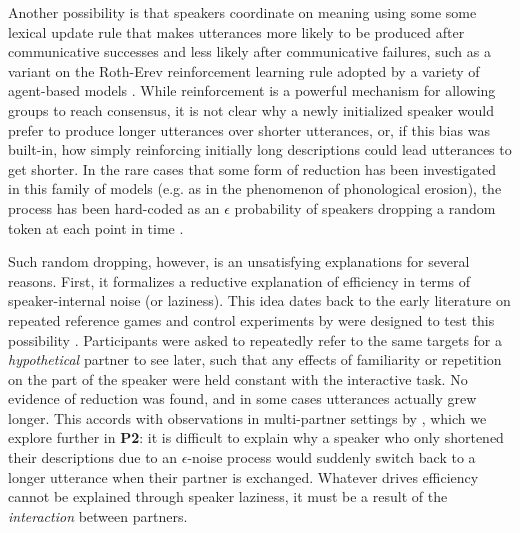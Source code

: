 Another possibility is that speakers coordinate on meaning using some some lexical update rule that makes utterances more likely to be produced after communicative successes and less likely after communicative failures, such as a variant on the Roth-Erev reinforcement learning rule \cite{erev1998predicting} adopted by a variety of agent-based models \cite{steels_self-organizing_1995,barr_establishing_2004,young_evolution_2015}.
While reinforcement is a powerful mechanism for allowing groups to reach consensus, it is not clear why a newly initialized speaker would prefer to produce longer utterances over shorter utterances, or, if this bias was built-in, how simply reinforcing initially long descriptions could lead utterances to get shorter. 
In the rare cases that some form of reduction has been investigated in this family of models (e.g. as in the phenomenon of phonological erosion), the process has been hard-coded as an $\epsilon$ probability of speakers dropping a random token at each point in time \cite{beuls2013agent,steels2016agent}.


Such random dropping, however, is an unsatisfying explanations for several reasons.
First, it formalizes a reductive explanation of efficiency in terms of speaker-internal noise (or laziness). This idea dates back to the early literature on repeated reference games and
control experiments by  were designed to test this possibility \cite<see also>{GarrodFayLeeOberlanderMacLeod07_GraphicalSymbolSystems}. 
Participants were asked to repeatedly refer to the same targets for a \emph{hypothetical} partner to see later, such that any effects of familiarity or repetition on the part of the speaker were held constant with the interactive task. 
No evidence of reduction was found, and in some cases utterances actually grew longer.
This accords with observations in multi-partner settings by , which we explore further in \textbf{P2}: it is difficult to explain why a speaker who only shortened their descriptions due to an $\epsilon$-noise process would suddenly switch back to a longer utterance when their partner is exchanged.
Whatever drives efficiency cannot be explained through speaker laziness, it must be a result of the \emph{interaction} between partners.


